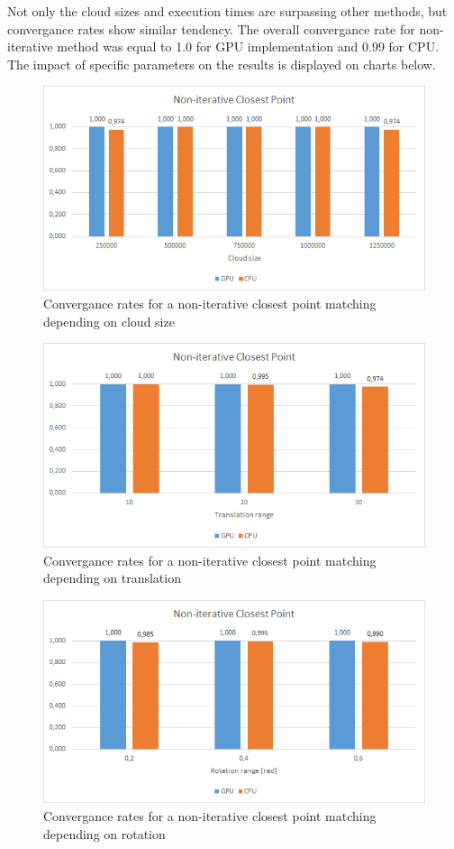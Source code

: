 \documentclass[titlepage]{article}
\begin{document}
Not only the cloud sizes and execution times are surpassing other methods, but convergance rates show similar tendency. The overall convergance rate for non-iterative method was equal to 1.0 for GPU implementation and 0.99 for CPU. The impact of specific parameters on the results is displayed on charts below.
\begin{figure}[H]
\includegraphics[width=\textwidth]{ss-nicp-1.png}
\caption{Convergance rates for a non-iterative closest point matching depending on cloud size}
\end{figure}
\begin{figure}[H]
\includegraphics[width=\textwidth]{ss-nicp-2.png}
\caption{Convergance rates for a non-iterative closest point matching depending on translation}
\end{figure}
\begin{figure}[H]
\includegraphics[width=\textwidth]{ss-nicp-3.png}
\caption{Convergance rates for a non-iterative closest point matching depending on rotation}
\end{figure}
\end{document}
